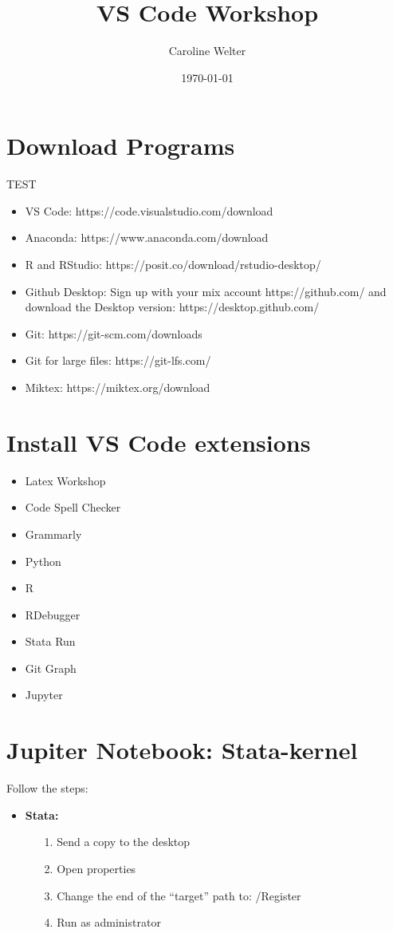 \documentclass[12pt]{article}
\title{VS Code Workshop}
\author{Caroline Welter}
\date{\today}
\begin{document}
 
\maketitle
{}
\thispagestyle{empty}


\section{Download Programs}

TEST 

\begin{itemize}
  \item VS Code: https://code.visualstudio.com/download
  \item Anaconda: https://www.anaconda.com/download 
  \item R and RStudio: https://posit.co/download/rstudio-desktop/
  \item Github Desktop: Sign up with your mix account https://github.com/ and download the Desktop version: https://desktop.github.com/
  \item Git: https://git-scm.com/downloads
  \item Git for large files: https://git-lfs.com/
  \item Miktex: https://miktex.org/download 
\end{itemize}

\section{Install VS Code extensions}
\begin{itemize}
  \item Latex Workshop
  \item Code Spell Checker
  \item Grammarly
  \item Python
  \item R
  \item RDebugger
  \item Stata Run
  \item Git Graph
  \item Jupyter
\end{itemize}

\section{Jupiter Notebook: Stata-kernel}

Follow the steps:
\begin{itemize}
  \item \textbf{Stata:}
    \begin{itemize}
      \item[1.] Send a copy to the desktop
      \item[2.] Open properties 
      \item[3.] Change the end of the “target” path to:  /Register
      \item[4.] Run as administrator
    \end{itemize}
\end{itemize}
\end{document}
